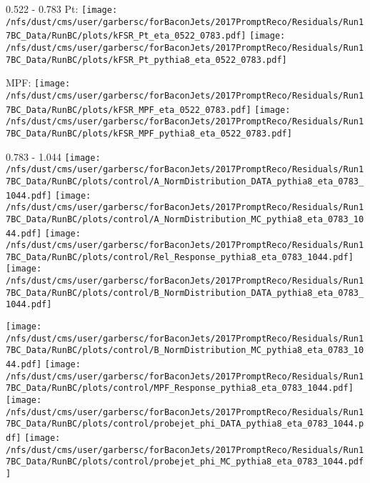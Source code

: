 \documentclass[t,compress]{beamer}
\begin{document}
\begin{frame}{0.522 - 0.783}
	 Pt: \texttt{[image: /nfs/dust/cms/user/garbersc/forBaconJets/2017PromptReco/Residuals/Run17BC\_Data/RunBC/plots/kFSR\_Pt\_eta\_0522\_0783.pdf]}
	\texttt{[image: /nfs/dust/cms/user/garbersc/forBaconJets/2017PromptReco/Residuals/Run17BC\_Data/RunBC/plots/kFSR\_Pt\_pythia8\_eta\_0522\_0783.pdf]}
\newline

	 MPF: \texttt{[image: /nfs/dust/cms/user/garbersc/forBaconJets/2017PromptReco/Residuals/Run17BC\_Data/RunBC/plots/kFSR\_MPF\_eta\_0522\_0783.pdf]}
	\texttt{[image: /nfs/dust/cms/user/garbersc/forBaconJets/2017PromptReco/Residuals/Run17BC\_Data/RunBC/plots/kFSR\_MPF\_pythia8\_eta\_0522\_0783.pdf]}
\end{frame}

\begin{frame}{0.783 - 1.044}
	\texttt{[image: /nfs/dust/cms/user/garbersc/forBaconJets/2017PromptReco/Residuals/Run17BC\_Data/RunBC/plots/control/A\_NormDistribution\_DATA\_pythia8\_eta\_0783\_1044.pdf]}
	\texttt{[image: /nfs/dust/cms/user/garbersc/forBaconJets/2017PromptReco/Residuals/Run17BC\_Data/RunBC/plots/control/A\_NormDistribution\_MC\_pythia8\_eta\_0783\_1044.pdf]}
	\texttt{[image: /nfs/dust/cms/user/garbersc/forBaconJets/2017PromptReco/Residuals/Run17BC\_Data/RunBC/plots/control/Rel\_Response\_pythia8\_eta\_0783\_1044.pdf]}
	\texttt{[image: /nfs/dust/cms/user/garbersc/forBaconJets/2017PromptReco/Residuals/Run17BC\_Data/RunBC/plots/control/B\_NormDistribution\_DATA\_pythia8\_eta\_0783\_1044.pdf]}
\newline

	\texttt{[image: /nfs/dust/cms/user/garbersc/forBaconJets/2017PromptReco/Residuals/Run17BC\_Data/RunBC/plots/control/B\_NormDistribution\_MC\_pythia8\_eta\_0783\_1044.pdf]}
	\texttt{[image: /nfs/dust/cms/user/garbersc/forBaconJets/2017PromptReco/Residuals/Run17BC\_Data/RunBC/plots/control/MPF\_Response\_pythia8\_eta\_0783\_1044.pdf]}
	\texttt{[image: /nfs/dust/cms/user/garbersc/forBaconJets/2017PromptReco/Residuals/Run17BC\_Data/RunBC/plots/control/probejet\_phi\_DATA\_pythia8\_eta\_0783\_1044.pdf]}
	\texttt{[image: /nfs/dust/cms/user/garbersc/forBaconJets/2017PromptReco/Residuals/Run17BC\_Data/RunBC/plots/control/probejet\_phi\_MC\_pythia8\_eta\_0783\_1044.pdf]}
\end{frame}
\end{document}
